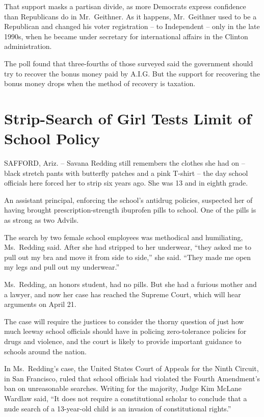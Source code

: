 \documentclass[12pt,a4paper,onecolumn]{article}
\begin{document}
\begin{CJK*}{GBK}{song}
That support masks a partisan divide, as more Democrats express confidence than Republicans do in
Mr.~Geithner. As it happens, Mr.~Geithner used to be a Republican and changed his voter registration
-- to Independent -- only in the late 1990s, when he became under secretary for international
affairs in the Clinton administration.

The poll found that three-fourths of those surveyed said the government should try to recover the
bonus money paid by A.I.G. But the support for recovering the bonus money drops when the method of
recovery is taxation.

\section{Strip-Search of Girl Tests Limit of School Policy}

SAFFORD, Ariz. -- Savana Redding still remembers the clothes she had on -- black stretch pants with
butterfly patches and a pink T-shirt -- the day school officials here forced her to strip six years
ago. She was 13 and in eighth grade.

An assistant principal, enforcing the school's antidrug policies, suspected her of having brought
prescription-strength ibuprofen pills to school. One of the pills is as strong as two Advils.

The search by two female school employees was methodical and humiliating, Ms.~Redding said. After
she had stripped to her underwear, ``they asked me to pull out my bra and move it from side to
side,'' she said. ``They made me open my legs and pull out my underwear.''

Ms.~Redding, an honors student, had no pills. But she had a furious mother and a lawyer, and now her
case has reached the Supreme Court, which will hear arguments on April 21.

The case will require the justices to consider the thorny question of just how much leeway school
officials should have in policing zero-tolerance policies for drugs and violence, and the court is
likely to provide important guidance to schools around the nation.

In Ms.~Redding's case, the United States Court of Appeals for the Ninth Circuit, in San Francisco,
ruled that school officials had violated the Fourth Amendment's ban on unreasonable searches.
Writing for the majority, Judge Kim McLane Wardlaw said, ``It does not require a constitutional
scholar to conclude that a nude search of a 13-year-old child is an invasion of constitutional
rights.''


\end{CJK*}
\end{document}
